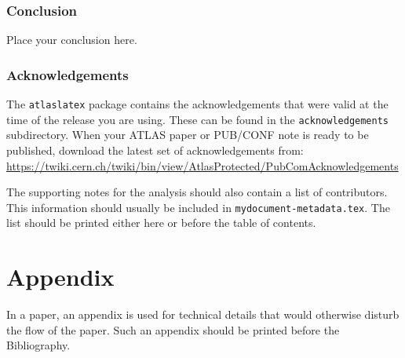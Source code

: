 \documentclass[texmf,UKenglish,texlive=2016]{atlasdoc}
\begin{document}
\section{Conclusion}
\label{sec:conclusion}

Place your conclusion here.


\section*{Acknowledgements}

%

The \texttt{atlaslatex} package contains the acknowledgements that were valid 
at the time of the release you are using.
These can be found in the \texttt{acknowledgements} subdirectory.
When your ATLAS paper or PUB/CONF note is ready to be published,
download the latest set of acknowledgements from:\\
\url{https://twiki.cern.ch/twiki/bin/view/AtlasProtected/PubComAcknowledgements}

The supporting notes for the analysis should also contain a list of contributors.
This information should usually be included in \texttt{mydocument-metadata.tex}.
The list should be printed either here or before the table of contents.


\clearpage
\appendix
\part*{Appendix}

In a paper, an appendix is used for technical details that would otherwise disturb the flow of the paper.
Such an appendix should be printed before the Bibliography.


\printbibliography
%
%
\end{document}
